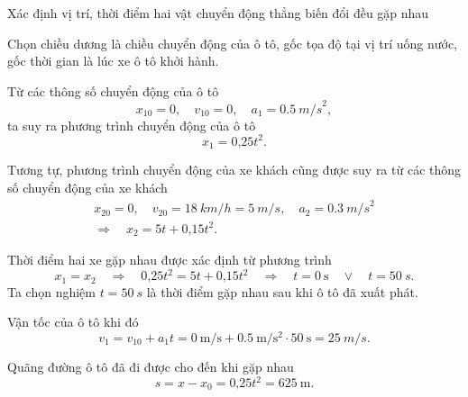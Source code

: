 \begin{dang}{Xác định vị trí, thời điểm hai vật chuyển động thẳng biến đổi đều gặp nhau}
{		Chọn chiều dương là chiều chuyển động của ô tô, gốc tọa độ tại vị trí uống nước, gốc thời gian là lúc xe ô tô khởi hành.
		
		Từ các thông số chuyển động của ô tô
		$$x_{10} = 0,\quad v_{10} = 0,\quad a_{1} = \SI{0,5}{m/s}^2,$$	
		ta suy ra phương trình chuyển động của ô tô
		$$x_1 = \text{0,25}t^2.$$
		
		Tương tự, phương trình chuyển động của xe khách cũng được suy ra từ các thông số chuyển động của xe khách
		\begin{equation*}
			\begin{gathered}
				x_{20} = 0,\quad v_{20} =\SI{18}{km/h}=\SI{5}{m/s},\quad a_{2} = \SI{0,3}{m/s}^2\\
				\Rightarrow\quad x_2 =5t+\text{0,15}t^2.
			\end{gathered}
		\end{equation*}
		
		Thời điểm hai xe gặp nhau được xác định từ phương trình 
		$$x_1=x_2 \quad\Rightarrow\quad \text{0,25}t^2=5t+\text{0,15}t^2 \quad\Rightarrow\quad t=\SI{0}{\second}\quad\vee\quad t =\SI{50}{s}.$$
		Ta chọn nghiệm $t =\SI{50}{s}$ là thời điểm gặp nhau sau khi ô tô đã xuất phát. 
		
		Vận tốc của ô tô khi đó
		$$v_1 = v_{10}+ a_1t = \SI{0}{\meter/\second}+\SI{0.5}{\meter/\second^{2}}\cdot\SI{50}{\second}=\SI{25}{m/s}.$$  
		
		Quãng đường ô tô đã đi được cho đến khi gặp nhau 
		$$s=x-x_0 =\text{0,25}t^2 = \SI{625}{\meter}.$$	
	}
\end{dang}
